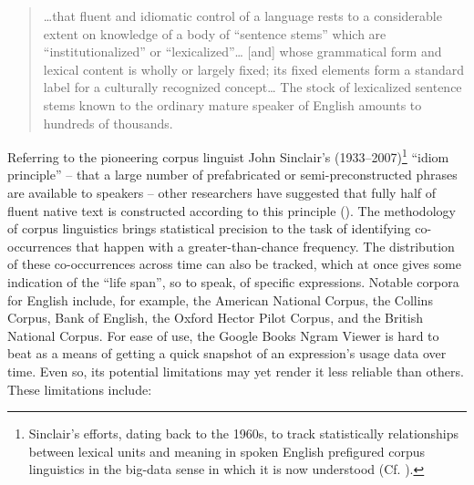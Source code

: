 \documentclass[output=paper]{langsci/langscibook}
\begin{document}
\begin{quote}
…that fluent and idiomatic control of a language rests to a considerable extent on knowledge of a body of ``sentence stems'' which are ``institutionalized'' or ``lexicalized''… [and] whose grammatical form and lexical content is wholly or largely fixed; its fixed elements form a standard label for a culturally recognized concept… The stock of lexicalized sentence stems known to the ordinary mature speaker of English amounts to hundreds of thousands.  
\end{quote}

Referring to the pioneering corpus linguist John Sinclair’s (1933--2007)\footnote{Sinclair’s efforts, dating back to the 1960s, to track statistically relationships between lexical units and meaning in spoken English prefigured corpus linguistics in the big-data sense in which it is now understood (Cf. \citealt{chapelle_encyclopedia_2013-1}).} ``idiom principle'' – that a large number of prefabricated or semi-preconstructed phrases are available to speakers – other researchers have suggested that fully half of fluent native text is constructed according to this principle (\citealt[29]{erman_idiom_2000}). The methodology of corpus linguistics brings statistical precision to the task of identifying co-occurrences that happen with a greater-than-chance frequency.  The distribution of these co-occurrences across time can also be tracked, which at once gives some indication of the ``life span'', so to speak, of specific expressions. Notable corpora for English include, for example, the American National Corpus, the Collins Corpus, Bank of English, the Oxford Hector Pilot Corpus, and the British National Corpus. For ease of use, the Google Books Ngram Viewer is hard to beat as a means of getting a quick snapshot of an expression’s usage data over time.  Even so, its potential limitations may yet render it less reliable than others. These limitations include: 
\end{document}
